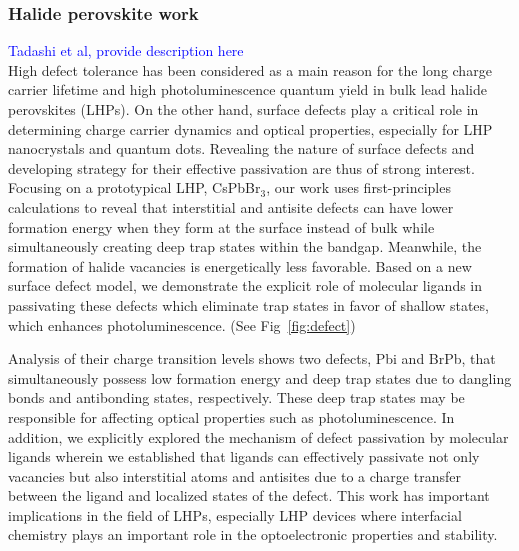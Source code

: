 \subsubsection{Halide perovskite work}
\textcolor{blue}{Tadashi et al, provide description here}\\

High defect tolerance has been considered as a main reason for the long charge carrier lifetime and
high photoluminescence quantum yield in bulk lead halide perovskites (LHPs). On the other hand,
surface defects play a critical role in determining charge carrier dynamics and optical properties,
especially for LHP nanocrystals and quantum dots. Revealing the nature of surface defects and
developing strategy for their effective passivation are thus of strong interest. Focusing on a
prototypical LHP, CsPbBr$_3$, our work uses first-principles calculations to reveal that interstitial and
antisite defects can have lower formation energy when they form at the surface instead of bulk while
simultaneously creating deep trap states within the bandgap. Meanwhile, the formation of halide
vacancies is energetically less favorable. Based on a new surface defect model, we demonstrate the
explicit role of molecular ligands in passivating these defects which eliminate trap states in favor of
shallow states, which enhances photoluminescence. (See Fig~\ref{fig:defect})

Analysis of their charge transition levels shows two
defects, Pbi and BrPb, that simultaneously possess low formation energy and deep trap states due to
dangling bonds and antibonding states, respectively. These deep trap states may be responsible for
affecting optical properties such as photoluminescence. In addition, we explicitly explored the
mechanism of defect passivation by molecular ligands wherein we established that ligands can
effectively passivate not only vacancies but also interstitial atoms and antisites due to a charge transfer
between the ligand and localized states of the defect. This work has important implications in the field
of LHPs, especially LHP devices where interfacial chemistry plays an important role in the
optoelectronic properties and stability.

